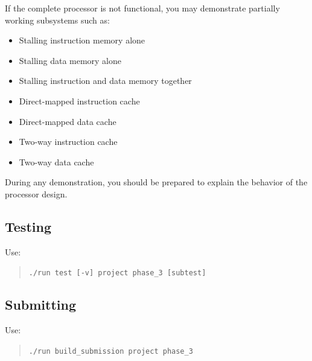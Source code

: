 \documentclass[12pt]{article}
\begin{document}
If the complete processor is not functional, you may demonstrate partially working
subsystems such as:

\begin{itemize}
\item Stalling instruction memory alone
\item Stalling data memory alone
\item Stalling instruction and data memory together
\item Direct-mapped instruction cache
\item Direct-mapped data cache
\item Two-way instruction cache
\item Two-way data cache
\end{itemize}

During any demonstration, you should be prepared to explain the behavior of the processor design.

\subsection*{Testing}

Use:
\begin{quote}
\texttt{./run test [-v] project phase\_3 [subtest]}
\end{quote}

\subsection*{Submitting}

Use:
\begin{quote}
\texttt{./run build\_submission project phase\_3}
\end{quote}
\end{document}
